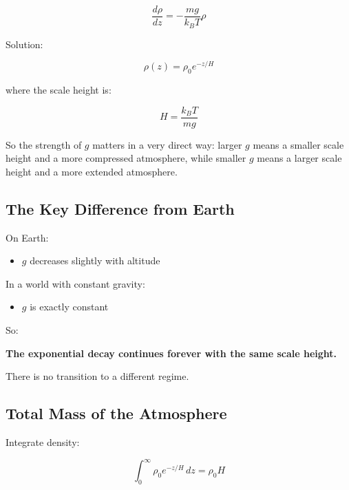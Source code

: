 \documentclass[11pt, letterpaper]{article}
\begin{document}
\begin{equation}
\frac{d\rho}{dz} = -\frac{m g}{k_B T} \rho
\end{equation}

Solution:

\begin{equation}
\rho(z) = \rho_0 e^{-z/H}
\end{equation}

where the scale height is:

\begin{equation}
H = \frac{k_B T}{m g}
\end{equation}

So the strength of \(g\) matters in a very direct way: larger \(g\) means a smaller scale height and a more compressed atmosphere, while smaller \(g\) means a larger scale height and a more extended atmosphere.

\subsection{The Key Difference from Earth}

On Earth:

\begin{itemize}
\item $g$ decreases slightly with altitude
\end{itemize}

In a world with constant gravity:

\begin{itemize}
\item $g$ is exactly constant
\end{itemize}

So:

\begin{center}
\textbf{The exponential decay continues forever with the same scale height.}
\end{center}

There is no transition to a different regime.

\subsection{Total Mass of the Atmosphere}

Integrate density:

\begin{equation}
\int_0^\infty \rho_0 e^{-z/H} \, dz = \rho_0 H
\end{equation}
\end{document}
